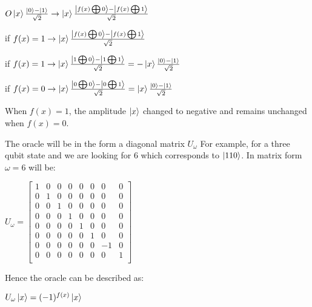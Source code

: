 \documentclass{article}
\begin{document}
\qquad \qquad $ O\ket{x}\frac{\ket{0} - \ket{1}}{\sqrt{2}} \rightarrow \ket{x} \frac{\ket{f(x) \bigoplus 0} - \ket{f(x) \bigoplus 1}}{\sqrt{2}}$
\vspace{5mm}

\qquad if $ f(x) =1 \rightarrow \ket{x}\frac{\ket{f(x) \bigoplus0} - \ket{f(x) \bigoplus1}}{\sqrt{2}}$
\vspace{5mm}

\qquad if $f(x) =1 \rightarrow \ket{x}\frac{\ket{1 \bigoplus 0} - \ket{1 \bigoplus 1}}{\sqrt{2}} = -\ket{x}\frac{\ket{0} - \ket{1}}{\sqrt{2}}$
\vspace{5mm}

\qquad if $f(x) =0 \rightarrow \ket{x}\frac{\ket{0 \bigoplus 0} - \ket{0 \bigoplus 1}}{\sqrt{2}} = \ket{x}\frac{\ket{0} - \ket{1}}{\sqrt{2}}$
\vspace{5mm}

When $f(x) = 1 $, the amplitude $\ket{x}$ changed to negative and remains unchanged when $f(x) = 0$.
\vspace{5mm}

\noindent
The oracle will be in the form a diagonal matrix $U_{\omega}$
\vspace{5mm}
\noindent
For example, for a three qubit state and we are looking for 6 which corresponds to $\ket{110}$. In matrix form $\omega =6$ will be:
\vspace{5mm}

\qquad $ U_\omega = \begin{bmatrix}

1 & 0 & 0 & 0 & 0& 0 & 0& 0 \\
0 & 1 & 0 & 0 & 0& 0 & 0& 0 \\
0 & 0 & 1 & 0 & 0& 0 & 0& 0 \\
0 & 0 & 0 & 1 & 0& 0 & 0& 0 \\
0 & 0 & 0 & 0 & 1& 0 & 0& 0 \\
0 & 0 & 0 & 0 & 0& 1 & 0& 0 \\
0 & 0 & 0 & 0 & 0& 0 & -1& 0 \\
0 & 0 & 0 & 0 & 0& 0 & 0& 1 \\

\end{bmatrix}$
\vspace{5mm}

Hence the oracle can be described as:
\vspace{5mm}

\qquad $U_\omega\ket{x} = (-1)^{f(x)} \ket{x}$
\vspace{5mm}
\end{document}
